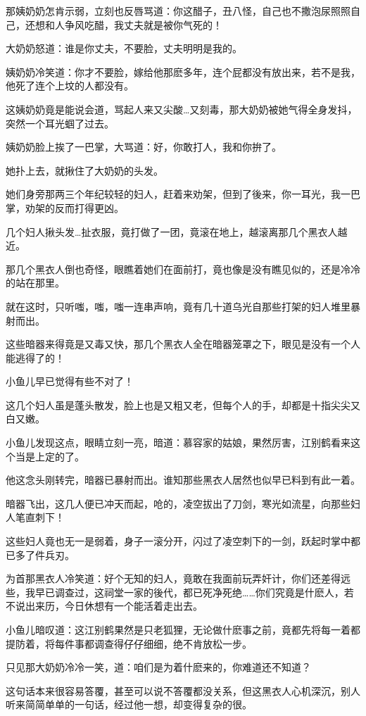 \documentclass[12pt,oneside]{book}
\begin{document}
那姨奶奶怎肯示弱，立刻也反唇骂道：你这醋子，丑八怪，自己也不撒泡尿照照自己，还想和人争风吃醋，我丈夫就是被你气死的！

大奶奶怒道：谁是你丈夫，不要脸，丈夫明明是我的。

姨奶奶冷笑道：你才不要脸，嫁给他那麽多年，连个屁都没有放出来，若不是我，他死了连个上坟的人都没有。

这姨奶奶竟是能说会道，骂起人来又尖酸\ldots 又刻毒，那大奶奶被她气得全身发抖，突然一个耳光蝈了过去。

姨奶奶脸上挨了一巴掌，大骂道：好，你敢打人，我和你拚了。

她扑上去，就揪住了大奶奶的头发。

她们身旁那两三个年纪较轻的妇人，赶着来劝架，但到了後来，你一耳光，我一巴掌，劝架的反而打得更凶。

几个妇人揪头发\ldots 扯衣服，竟打做了一团，竟滚在地上，越滚离那几个黑衣人越近。

那几个黑衣人倒也奇怪，眼瞧着她们在面前打，竟也像是没有瞧见似的，还是冷冷的站在那里。

就在这时，只听嗤，嗤，嗤一连串声响，竟有几十道乌光自那些打架的妇人堆里暴射而出。

这些暗器来得竟是又毒又快，那几个黑衣人全在暗器笼罩之下，眼见是没有一个人能逃得了的！

小鱼儿早已觉得有些不对了！

这几个妇人虽是蓬头散发，脸上也是又粗又老，但每个人的手，却都是十指尖尖又白又嫩。

小鱼儿发现这点，眼睛立刻一亮，暗道：慕容家的姑娘，果然厉害，江别鹤看来这个当是上定的了。

他这念头刚转完，暗器已暴射而出。谁知那些黑衣人居然也似早已料到有此一着。

暗器飞出，这几人便已冲天而起，呛的，凌空拔出了刀剑，寒光如流星，向那些妇人笔直刺下！

这些妇人竟也无一是弱着，身子一滚分开，闪过了凌空刺下的一剑，跃起时掌中都已多了件兵刃。

为首那黑衣人冷笑道：好个无知的妇人，竟敢在我面前玩弄奸计，你们还差得远些，我早已调查过，这祠堂一家的後代，都已死净死绝\ldots\ldots 你们究竟是什麽人，若不说出来历，今日休想有一个能活着走出去。

小鱼儿暗叹道：这江别鹤果然是只老狐狸，无论做什麽事之前，竟都先将每一着都提防着，将每件事都调查得仔仔细细，绝不肯放松一步。

只见那大奶奶冷冷一笑，道：咱们是为着什麽来的，你难道还不知道？

这句话本来很容易答覆，甚至可以说不答覆都没关系，但这黑衣人心机深沉，别人听来简简单单的一句话，经过他一想，却变得复杂的很。
\end{document}
